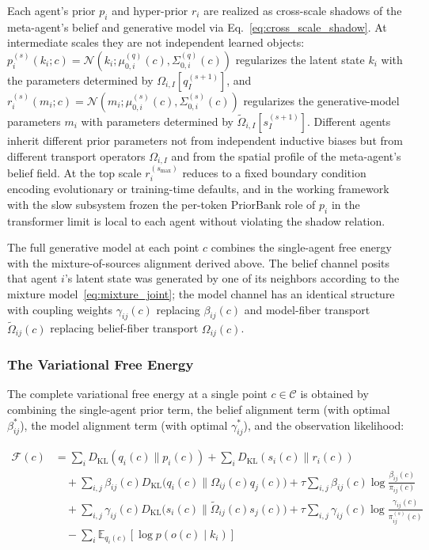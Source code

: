 \documentclass[11pt]{article}
\begin{document}
Each agent's prior $p_i$ and hyper-prior $r_i$ are realized as cross-scale shadows of the meta-agent's belief and generative model via Eq.~\eqref{eq:cross_scale_shadow}. At intermediate scales they are not independent learned objects: $p_i^{(s)}(k_i; c) = \mathcal{N}(k_i; \mu_{0,i}^{(q)}(c), \Sigma_{0,i}^{(q)}(c))$ regularizes the latent state $k_i$ with the parameters determined by $\Omega_{i,I}[q_I^{(s+1)}]$, and $r_i^{(s)}(m_i; c) = \mathcal{N}(m_i; \mu_{0,i}^{(s)}(c), \Sigma_{0,i}^{(s)}(c))$ regularizes the generative-model parameters $m_i$ with parameters determined by $\tilde\Omega_{i,I}[s_I^{(s+1)}]$. Different agents inherit different prior parameters not from independent inductive biases but from different transport operators $\Omega_{i,I}$ and from the spatial profile of the meta-agent's belief field. At the top scale $r_i^{(s_{\max})}$ reduces to a fixed boundary condition encoding evolutionary or training-time defaults, and in the working framework with the slow subsystem frozen the per-token PriorBank role of $p_i$ in the transformer limit is local to each agent without violating the shadow relation.

The full generative model at each point $c$ combines the single-agent free energy~\cite{Friston2010, parr2022active} with the mixture-of-sources alignment derived above. The belief channel posits that agent $i$'s latent state was generated by one of its neighbors according to the mixture model~\eqref{eq:mixture_joint}; the model channel has an identical structure with coupling weights $\gamma_{ij}(c)$ replacing $\beta_{ij}(c)$ and model-fiber transport $\tilde{\Omega}_{ij}(c)$ replacing belief-fiber transport $\Omega_{ij}(c)$.

\subsubsection{The Variational Free Energy}

The complete variational free energy at a single point $c \in \mathcal{C}$ is obtained by combining the single-agent prior term, the belief alignment term (with optimal $\beta^*_{ij}$), the model alignment term (with optimal $\gamma^*_{ij}$), and the observation likelihood:

\begin{equation}
\begin{aligned}
\mathcal{F}(c) &= \sum_i D_{\mathrm{KL}}(q_i(c) \| p_i(c)) + \sum_i D_{\mathrm{KL}}(s_i(c) \| r_i(c)) \\
&\quad + \sum_{i,j} \beta_{ij}(c)  D_{\mathrm{KL}}\big(q_i(c) \big\| \Omega_{ij}(c)q_j(c)\big) + \tau \sum_{i,j} \beta_{ij}(c) \log\frac{\beta_{ij}(c)}{\pi_{ij}(c)} \\
&\quad + \sum_{i,j} \gamma_{ij}(c)  D_{\mathrm{KL}}\big(s_i(c) \big\| \tilde{\Omega}_{ij}(c)s_j(c)\big) + \tau \sum_{i,j} \gamma_{ij}(c) \log\frac{\gamma_{ij}(c)}{\pi^{(s)}_{ij}(c)} \\
&\quad - \sum_i \mathbb{E}_{q_i(c)}[\log p(o(c) \mid k_i)]
\end{aligned}
\label{eq:pointwise_free_energy}
\end{equation}
\end{document}

